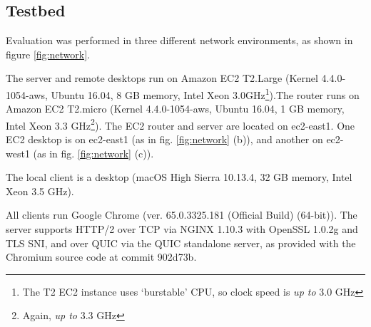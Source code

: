 \documentclass[12pt]{article}
\begin{document}
\subsection{Testbed}
Evaluation was performed in three different network environments, as shown in figure \ref{fig:network}.

The server and remote desktops run on Amazon EC2 T2.Large (Kernel 4.4.0-1054-aws, Ubuntu 16.04, 8 GB memory, Intel Xeon 3.0GHz\footnote{The T2 EC2 instance uses `burstable' CPU, so clock speed is \emph{up to} 3.0 GHz}).The router runs on Amazon EC2 T2.micro (Kernel 4.4.0-1054-aws, Ubuntu 16.04, 1 GB memory, Intel Xeon 3.3 GHz\footnote{Again, \emph{up to} 3.3 GHz}). The EC2 router and server are located on ec2-east1. One EC2 desktop is on ec2-east1 (as in fig. \ref{fig:network} (b)), and another on ec2-west1 (as in fig. \ref{fig:network} (c)).

The local client is a desktop (macOS High Sierra 10.13.4, 32 GB memory, Intel Xeon 3.5 GHz).

All clients run Google Chrome (ver. 65.0.3325.181 (Official Build) (64-bit)). The server supports HTTP/2 over TCP via NGINX 1.10.3 with OpenSSL 1.0.2g and TLS SNI, and over QUIC via the QUIC standalone server, as provided with the Chromium source code at commit 902d73b.
\end{document}
